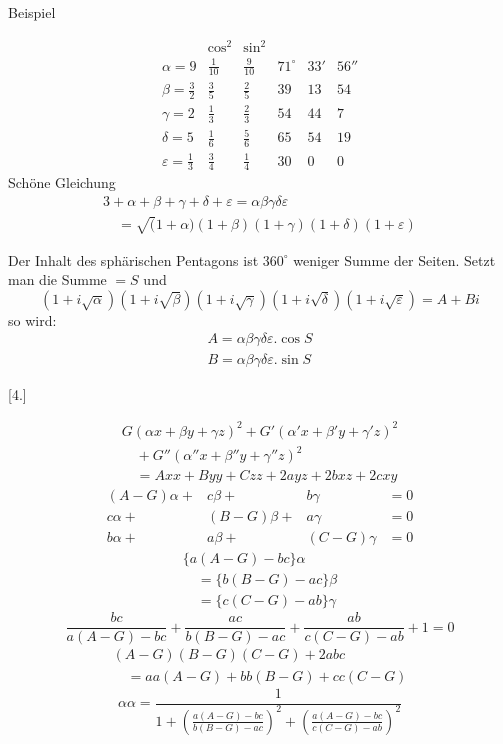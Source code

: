 Beispiel



\[
\begin{array}{lccrrr} &\cos^{2}&\sin^{2}&&&\\[9pt] \alpha=9&\frac{1}{10}&\frac{9}{10}&71^{\circ}&33'&56''\\[9pt] \beta=\frac{3}{2}&\frac{3}{5}&\frac{2}{5}&39&13&54\\[9pt] \gamma=2&\frac{1}{3}&\frac{2}{3}&54&44&7\\[9pt] \delta=5&\frac{1}{6}&\frac{5}{6}&65&54&19\\[9pt] \varepsilon=\frac{1}{3}&\frac{3}{4}&\frac{1}{4}&30&0&0 \end{array}
\]
Schöne Gleichung
\[
\begin{gathered}3+\alpha+\beta+\gamma+\delta+\varepsilon =\alpha\beta\gamma\delta\varepsilon \\[9pt]\quad{}=\surd(1+\alpha)(1+\beta)(1+\gamma)(1+\delta)(1+\varepsilon)\end{gathered}
\]
\par Der Inhalt des sphärischen Pentagons ist $360^{\circ}$ weniger Summe der Seiten.
Setzt man die Summe $=S$ und
\[
(1+i\surd\alpha)(1+i\surd\beta)(1+i\surd\gamma) (1+i\surd\delta)(1+i\surd\varepsilon)=A+Bi
\]
so wird:
\[
\begin{gathered} A=\alpha\beta\gamma\delta\varepsilon.\cos S\\[9pt] B=\alpha\beta\gamma\delta\varepsilon.\sin S \end{gathered}
\]
\par\medskip{}\centerline{[4.]}\nobreak\smallskip
\[
\begin{gathered} G(\alpha x+\beta y+\gamma z)^2 +G'(\alpha'x+\beta'y+\gamma'z)^2 \\[9pt]\quad{}+G''(\alpha''x+\beta''y+\gamma''z)^2\\[9pt] \quad=Axx+Byy+Czz+2ayz+2bxz+2cxy \end{gathered}
\]
\[
\begin{array}{rrrr} (A-G)\alpha+&c\beta+&b\gamma&=0\\[9pt] c\alpha+&(B-G)\beta+&a\gamma&=0\\[9pt] b\alpha+&a\beta+&(C-G)\gamma&=0 \end{array}
\]
\[
\begin{gathered}\{a(A-G)-bc\}\alpha\\[9pt]\quad{}=\{b(B-G)-ac\}\beta\\[9pt]\quad{}=\{c(C-G)-ab\}\gamma\end{gathered}
\]
\[
\frac{bc}{a(A-G)-bc}+\frac{ac}{b(B-G)-ac} +\frac{ab}{c(C-G)-ab}+1=0
\]
\[
\begin{gathered}(A-G)(B-G)(C-G)+2abc\\[9pt]\quad{}=aa(A-G)+bb(B-G)+cc(C-G)\end{gathered}
\]
\[
\alpha\alpha=\frac{1}{1+ \left(\frac{a(A-G)-bc}{b(B-G)-ac}\right)^2+ \left(\frac{a(A-G)-bc}{c(C-G)-ab}\right)^2}
\]

